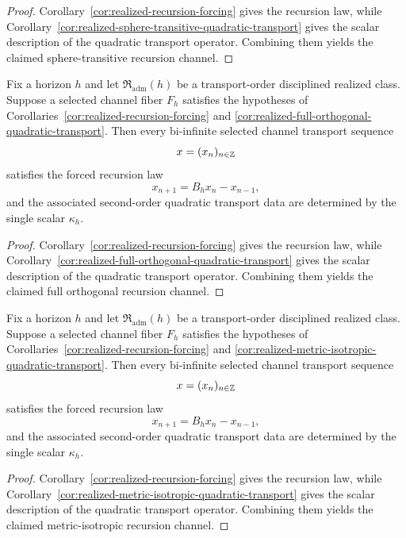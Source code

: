 \begin{proof}
Corollary~\ref{cor:realized-recursion-forcing} gives the recursion law, while
Corollary~\ref{cor:realized-sphere-transitive-quadratic-transport} gives the
scalar description of the quadratic transport operator. Combining them yields
the claimed sphere-transitive recursion channel.
\end{proof}

\begin{corollary}
\label{cor:realized-full-orthogonal-recursion-channel}
Fix a horizon $h$ and let $\mathfrak R_{\mathrm{adm}}(h)$ be a transport-order
disciplined realized class. Suppose a selected channel fiber $F_h$ satisfies
the hypotheses of Corollaries~\ref{cor:realized-recursion-forcing} and
\ref{cor:realized-full-orthogonal-quadratic-transport}. Then every bi-infinite
selected channel transport sequence
\[
x=(x_n)_{n\in\mathbb{Z}}
\]
satisfies the forced recursion law
\[
x_{n+1}=B_hx_n-x_{n-1},
\]
and the associated second-order quadratic transport data are determined by the
single scalar $\kappa_h$.
\end{corollary}

\begin{proof}
Corollary~\ref{cor:realized-recursion-forcing} gives the recursion law, while
Corollary~\ref{cor:realized-full-orthogonal-quadratic-transport} gives the
scalar description of the quadratic transport operator. Combining them yields
the claimed full orthogonal recursion channel.
\end{proof}

\begin{corollary}
\label{cor:realized-metric-isotropic-recursion-channel}
Fix a horizon $h$ and let $\mathfrak R_{\mathrm{adm}}(h)$ be a transport-order
disciplined realized class. Suppose a selected channel fiber $F_h$ satisfies
the hypotheses of Corollaries~\ref{cor:realized-recursion-forcing} and
\ref{cor:realized-metric-isotropic-quadratic-transport}. Then every bi-infinite
selected channel transport sequence
\[
x=(x_n)_{n\in\mathbb{Z}}
\]
satisfies the forced recursion law
\[
x_{n+1}=B_hx_n-x_{n-1},
\]
and the associated second-order quadratic transport data are determined by the
single scalar $\kappa_h$.
\end{corollary}

\begin{proof}
Corollary~\ref{cor:realized-recursion-forcing} gives the recursion law, while
Corollary~\ref{cor:realized-metric-isotropic-quadratic-transport} gives the
scalar description of the quadratic transport operator. Combining them yields
the claimed metric-isotropic recursion channel.
\end{proof}

